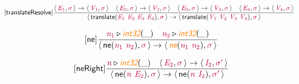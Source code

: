 \documentclass[10pt,leqno,fleqn]{article}
\newcommand{\artVariable}[1]{\mbox{\color{purple}\em #1\/}}
\newcommand{\artConstructor}[1]{\mbox{\sf #1}}
\newcommand{\artSpecial}[1]{\mbox{\color{orange}\sf\em #1}}
\begin{document}
\begin{equation}
\tag*{[\artConstructor{\sf translateResolve}]}
\begin{split}\frac{\langle\, \artVariable{E$_{1}$}, \artVariable{$\sigma$}\,\rangle \rightarrow \langle\, \artVariable{V$_{1}$}, \artVariable{$\sigma$}\,\rangle \quad \langle\, \artVariable{E$_{2}$}, \artVariable{$\sigma$}\,\rangle \rightarrow \langle\, \artVariable{V$_{2}$}, \artVariable{$\sigma$}\,\rangle \quad \langle\, \artVariable{E$_{3}$}, \artVariable{$\sigma$}\,\rangle \rightarrow \langle\, \artVariable{V$_{3}$}, \artVariable{$\sigma$}\,\rangle \quad \langle\, \artVariable{E$_{4}$}, \artVariable{$\sigma$}\,\rangle \rightarrow \langle\, \artVariable{V$_{4}$}, \artVariable{$\sigma$}\,\rangle }{\langle\, \artConstructor{\sf translate}(\artVariable{E$_{1}$}\ \artVariable{E$_{2}$}\ \artVariable{E$_{3}$}\ \artVariable{E$_{4}$}), \artVariable{$\sigma$}\,\rangle \rightarrow \langle\, \artConstructor{\sf translate}(\artVariable{V$_{1}$}\ \artVariable{V$_{2}$}\ \artVariable{V$_{3}$}\ \artVariable{V$_{4}$}), \artVariable{$\sigma$}\,\rangle }
\end{split}
\end{equation}

\begin{equation}
\tag*{[\artConstructor{\sf ne}]}
\begin{split}\frac{ \artVariable{n$_{1}$}\triangleright \artSpecial{int32}(\_) \quad  \artVariable{n$_{2}$}\triangleright \artSpecial{int32}(\_) }{\langle\, \artConstructor{\sf ne}(\artVariable{n$_{1}$}\ \artVariable{n$_{2}$}), \artVariable{$\sigma$}\,\rangle \rightarrow \langle\, \artSpecial{ne}(\artVariable{n$_{1}$}\ \artVariable{n$_{2}$}), \artVariable{$\sigma$}\,\rangle }
\end{split}
\end{equation}

\begin{equation}
\tag*{[\artConstructor{\sf neRight}]}
\begin{split}\frac{ \artVariable{n}\triangleright \artSpecial{int32}(\_) \quad \langle\, \artVariable{E$_{2}$}, \artVariable{$\sigma$}\,\rangle \rightarrow \langle\, \artVariable{I$_{2}$}, \artVariable{$\sigma$\/$^\prime$}\,\rangle }{\langle\, \artConstructor{\sf ne}(\artVariable{n}\ \artVariable{E$_{2}$}), \artVariable{$\sigma$}\,\rangle \rightarrow \langle\, \artConstructor{\sf ne}(\artVariable{n}\ \artVariable{I$_{2}$}), \artVariable{$\sigma$\/$^\prime$}\,\rangle }
\end{split}
\end{equation}
\end{document}
